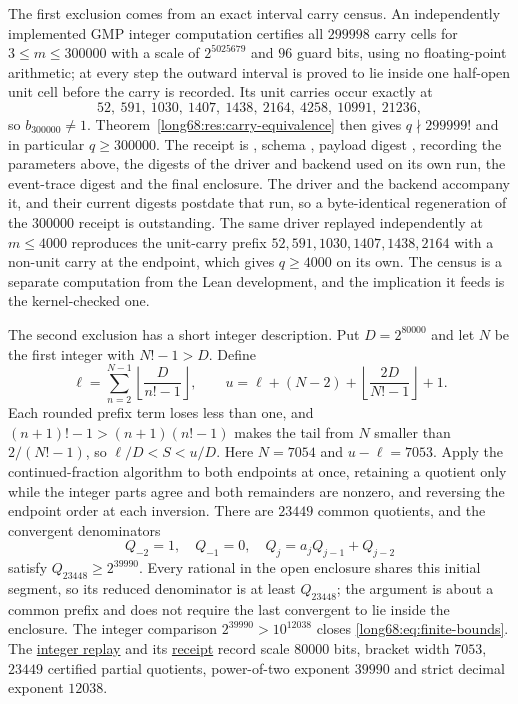 \documentclass[11pt]{article}
\newcommand{\Ser}{S}
\begin{document}
The first exclusion comes from an exact interval carry census.  An
independently implemented GMP integer computation certifies all $299998$
carry cells for $3\le m\le300000$ with a scale of $2^{5025679}$ and $96$
guard bits, using no floating-point arithmetic; at every step the outward
interval is proved to lie inside one half-open unit cell before the carry is
recorded.  Its unit carries occur exactly at
\[
 52,\ 591,\ 1030,\ 1407,\ 1438,\ 2164,\ 4258,\ 10991,\ 21236,
\]
so $b_{300000}\ne1$.  Theorem~\ref{long68:res:carry-equivalence} then gives
$q\nmid299999!$ and in particular $q\ge300000$.  The receipt is
, schema
, payload digest
,
recording the parameters above, the digests of the driver and backend used on
its own run, the event-trace digest and the final enclosure.  The driver
 and the backend
 accompany it, and their
current digests postdate that run, so a byte-identical regeneration of the
$300000$ receipt is outstanding.  The same driver replayed independently at
$m\le4000$ reproduces the unit-carry prefix $52,591,1030,1407,1438,2164$ with
a non-unit carry at the endpoint, which gives $q\ge4000$ on its own.  The
census is a separate computation from the Lean development, and the
implication it feeds is the kernel-checked one.

The second exclusion has a short integer description.  Put $D=2^{80000}$ and
let $N$ be the first integer with $N!-1>D$.  Define
\[
 \ell=\sum_{n=2}^{N-1}\left\lfloor\frac D{n!-1}\right\rfloor,
 \qquad
 u=\ell+(N-2)+\left\lfloor\frac{2D}{N!-1}\right\rfloor+1 .
\]
Each rounded prefix term loses less than one, and $(n+1)!-1>(n+1)(n!-1)$
makes the tail from $N$ smaller than $2/(N!-1)$, so $\ell/D<\Ser<u/D$.  Here
$N=7054$ and $u-\ell=7053$.  Apply the continued-fraction algorithm to both
endpoints at once, retaining a quotient only while the integer parts agree
and both remainders are nonzero, and reversing the endpoint order at each
inversion.  There are $23449$ common quotients, and the convergent
denominators
\[
 Q_{-2}=1,\quad Q_{-1}=0,\quad Q_j=a_jQ_{j-1}+Q_{j-2}
\]
satisfy $Q_{23448}\ge2^{39990}$.  Every rational in the open enclosure shares
this initial segment, so its reduced denominator is at least $Q_{23448}$; the
argument is about a common prefix and does not require the last convergent to
lie inside the enclosure.  The integer comparison $2^{39990}>10^{12038}$
closes \eqref{long68:eq:finite-bounds}.  The
\href{https://github.com/wcook04/plectis-erdos/blob/cd3bd6fe245867a435e15d503ccedd699c5d02e2/scripts/check_erdos68_continued_fraction.py}{integer
replay} and its
\href{https://github.com/wcook04/plectis-erdos/blob/cd3bd6fe245867a435e15d503ccedd699c5d02e2/verification/erdos68-continued-fraction.json}{receipt}
record scale $80000$ bits, bracket width $7053$, $23449$ certified partial
quotients, power-of-two exponent $39990$ and strict decimal exponent $12038$.
\end{document}
